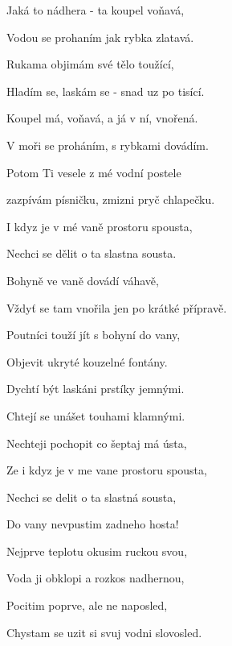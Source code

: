 

\zs
{} 

 

 

 
\ks

\zs
Jaká to nádhera - ta koupel voňavá,

Vodou se prohaním jak rybka zlatavá.

Rukama objimám své tělo toužící,

Hladím se, laskám se - snad uz po tisící.
\ks

\zr 
Koupel má, voňavá, a já v ní, vnořená.

V moři se proháním, s rybkami dovádím.

Potom Ti vesele z mé vodní postele

zazpívám písničku, zmizni pryč chlapečku.
\kr

\zs
I kdyz je v mé vaně prostoru spousta, 

Nechci se dělit o ta slastna sousta.

Bohyně ve vaně dovádí váhavě,

Vždyť se tam vnořila jen po krátké přípravě.
\ks

\zs
Poutníci touží jít s bohyní do vany,

Objevit ukryté kouzelné fontány.

Dychtí být laskáni prstíky jemnými.

Chtejí se unášet touhami klamnými.
\ks

\zs
Nechteji pochopit co šeptaj má ústa,

Ze i kdyz je v me vane prostoru spousta,

Nechci se delit o ta slastná sousta,

Do vany nevpustim zadneho hosta!
\ks

\zr
\kr

\zs
Nejprve teplotu okusim ruckou svou,

Voda ji obklopi a rozkos nadhernou,

Pocitim poprve, ale ne naposled,

Chystam se uzit si svuj vodni slovosled.
\ks

\kp
